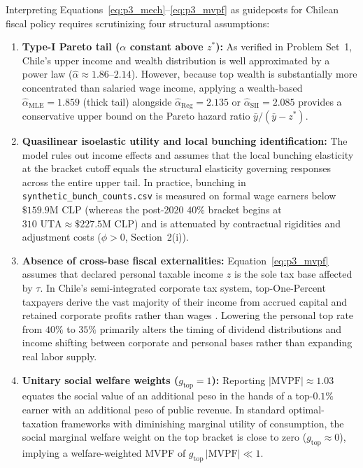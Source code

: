 Interpreting Equations~\eqref{eq:p3_mech}--\eqref{eq:p3_mvpf} as guideposts for Chilean fiscal policy requires scrutinizing four structural assumptions:
\begin{enumerate}
    \item \textbf{Type-I Pareto tail ($\alpha$ constant above $z^*$):} As verified in Problem Set~1, Chile's upper income and wealth distribution is well approximated by a power law ($\hat{\alpha} \approx 1.86$--$2.14$). However, because top wealth is substantially more concentrated than salaried wage income, applying a wealth-based $\hat{\alpha}_{\mathrm{MLE}} = 1.859$ (thick tail) alongside $\hat{\alpha}_{\mathrm{Reg}} = 2.135$ or $\hat{\alpha}_{\mathrm{SII}} = 2.085$ provides a conservative upper bound on the Pareto hazard ratio $\bar{y}/(\bar{y}-z^*)$.
    \item \textbf{Quasilinear isoelastic utility and local bunching identification:} The model rules out income effects and assumes that the local bunching elasticity at the bracket cutoff equals the structural elasticity governing responses across the entire upper tail. In practice, bunching in \texttt{synthetic\_bunch\_counts.csv} is measured on formal wage earners below $\$159.9\text{M}$ CLP (whereas the post-2020 $40\%$ bracket begins at $310\text{ UTA} \approx \$227.5\text{M}$ CLP) and is attenuated by contractual rigidities and adjustment costs ($\phi > 0$, Section~2(i)).
    \item \textbf{Absence of cross-base fiscal externalities:} Equation~\eqref{eq:p3_mvpf} assumes that declared personal taxable income $z$ is the sole tax base affected by $\tau$. In Chile's semi-integrated corporate tax system, top-One-Percent taxpayers derive the vast majority of their income from accrued capital and retained corporate profits rather than wages \parencite{gutierrezNoExemption}. Lowering the personal top rate from $40\%$ to $35\%$ primarily alters the timing of dividend distributions and income shifting between corporate and personal bases rather than expanding real labor supply.
    \item \textbf{Unitary social welfare weights ($g_{\mathrm{top}} = 1$):} Reporting $|\mathrm{MVPF}| \approx 1.03$ equates the social value of an additional peso in the hands of a top-$0.1\%$ earner with an additional peso of public revenue. In standard optimal-taxation frameworks with diminishing marginal utility of consumption, the social marginal welfare weight on the top bracket is close to zero ($g_{\mathrm{top}} \approx 0$), implying a welfare-weighted MVPF of $g_{\mathrm{top}}\,|\mathrm{MVPF}| \ll 1$.
\end{enumerate}

